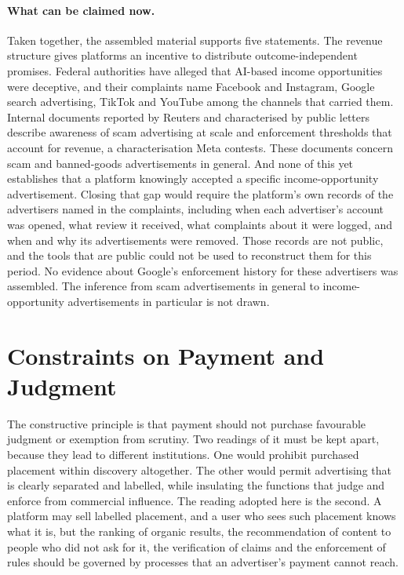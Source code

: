 \documentclass[12pt, a4paper]{article}
\begin{document}
\paragraph{What can be claimed now.} Taken together, the assembled material supports five statements. The revenue structure gives platforms an incentive to distribute outcome-independent promises. Federal authorities have alleged that AI-based income opportunities were deceptive, and their complaints name Facebook and Instagram, Google search advertising, TikTok and YouTube among the channels that carried them. Internal documents reported by Reuters and characterised by public letters describe awareness of scam advertising at scale and enforcement thresholds that account for revenue, a characterisation Meta contests. These documents concern scam and banned-goods advertisements in general. And none of this yet establishes that a platform knowingly accepted a specific income-opportunity advertisement. Closing that gap would require the platform's own records of the advertisers named in the complaints, including when each advertiser's account was opened, what review it received, what complaints about it were logged, and when and why its advertisements were removed. Those records are not public, and the tools that are public could not be used to reconstruct them for this period. No evidence about Google's enforcement history for these advertisers was assembled. The inference from scam advertisements in general to income-opportunity advertisements in particular is not drawn.

\section{Constraints on Payment and Judgment}
\label{sec:constraint}

The constructive principle is that payment should not purchase favourable judgment or exemption from scrutiny. Two readings of it must be kept apart, because they lead to different institutions. One would prohibit purchased placement within discovery altogether. The other would permit advertising that is clearly separated and labelled, while insulating the functions that judge and enforce from commercial influence. The reading adopted here is the second. A platform may sell labelled placement, and a user who sees such placement knows what it is, but the ranking of organic results, the recommendation of content to people who did not ask for it, the verification of claims and the enforcement of rules should be governed by processes that an advertiser's payment cannot reach.
\end{document}
